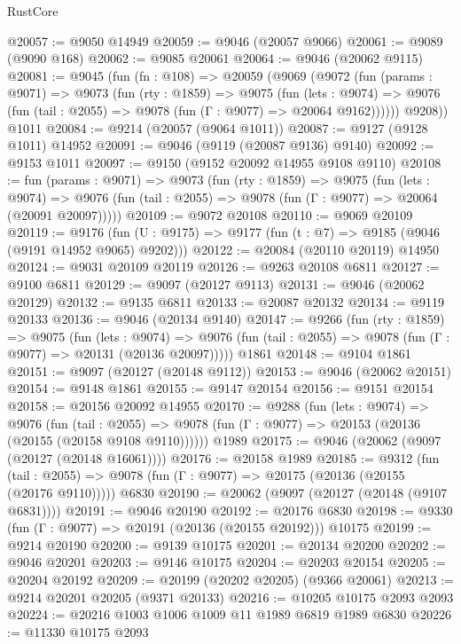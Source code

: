 \begin{lexlean}{RustCore}
\begin{coremodule}
@20057 := @9050 @14949
@20059 := @9046 (@20057 @9066)
@20061 := @9089 (@9090 @168)
@20062 := @9085 @20061
@20064 := @9046 (@20062 @9115)
@20081 := @9045
    (fun (fn : @108) =>
    @20059
      (@9069
        (@9072
          (fun (params : @9071) =>
          @9073
            (fun (rty : @1859) =>
            @9075
              (fun (lets : @9074) =>
              @9076 (fun (tail : @2055) => @9078 (fun (Γ : @9077) => @20064 @9162))))))
        @9208))
    @1011
@20084 := @9214 (@20057 (@9064 @1011))
@20087 := @9127 (@9128 @1011) @14952
@20091 := @9046 (@9119 (@20087 @9136) @9140)
@20092 := @9153 @1011
@20097 := @9150 (@9152 @20092 @14955 @9108 @9110)
@20108 := fun (params : @9071) =>
  @9073
    (fun (rty : @1859) =>
    @9075
      (fun (lets : @9074) =>
      @9076 (fun (tail : @2055) => @9078 (fun (Γ : @9077) => @20064 (@20091 @20097)))))
@20109 := @9072 @20108
@20110 := @9069 @20109
@20119 := @9176
    (fun (U : @9175) => @9177 (fun (t : @7) => @9185 (@9046 (@9191 @14952 @9065) @9202)))
@20122 := @20084 (@20110 @20119) @14950
@20124 := @9031 @20109 @20119
@20126 := @9263 @20108 @6811
@20127 := @9100 @6811
@20129 := @9097 (@20127 @9113)
@20131 := @9046 (@20062 @20129)
@20132 := @9135 @6811
@20133 := @20087 @20132
@20134 := @9119 @20133
@20136 := @9046 (@20134 @9140)
@20147 := @9266
    (fun (rty : @1859) =>
    @9075
      (fun (lets : @9074) =>
      @9076 (fun (tail : @2055) => @9078 (fun (Γ : @9077) => @20131 (@20136 @20097)))))
    @1861
@20148 := @9104 @1861
@20151 := @9097 (@20127 (@20148 @9112))
@20153 := @9046 (@20062 @20151)
@20154 := @9148 @1861
@20155 := @9147 @20154
@20156 := @9151 @20154
@20158 := @20156 @20092 @14955
@20170 := @9288
    (fun (lets : @9074) =>
    @9076
      (fun (tail : @2055) =>
      @9078 (fun (Γ : @9077) => @20153 (@20136 (@20155 (@20158 @9108 @9110))))))
    @1989
@20175 := @9046 (@20062 (@9097 (@20127 (@20148 @16061))))
@20176 := @20158 @1989
@20185 := @9312
    (fun (tail : @2055) => @9078 (fun (Γ : @9077) => @20175 (@20136 (@20155 (@20176 @9110)))))
    @6830
@20190 := @20062 (@9097 (@20127 (@20148 (@9107 @6831))))
@20191 := @9046 @20190
@20192 := @20176 @6830
@20198 := @9330 (fun (Γ : @9077) => @20191 (@20136 (@20155 @20192))) @10175
@20199 := @9214 @20190
@20200 := @9139 @10175
@20201 := @20134 @20200
@20202 := @9046 @20201
@20203 := @9146 @10175
@20204 := @20203 @20154
@20205 := @20204 @20192
@20209 := @20199 (@20202 @20205) (@9366 @20061)
@20213 := @9214 @20201 @20205 (@9371 @20133)
@20216 := @10205 @10175 @2093 @2093
@20224 := @20216 @1003 @1006 @1009 @11 @1989 @6819 @1989 @6830
@20226 := @11330 @10175 @2093

\end{coremodule}
\end{lexlean}
